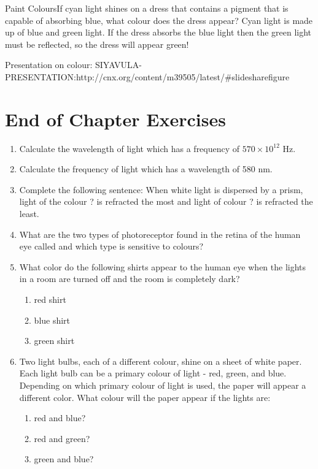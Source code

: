 \begin{wex}{Paint Colours}{If cyan light shines on a dress that contains a pigment that is capable of absorbing blue, what colour does the dress appear?}
{
Cyan light is made up of blue and green light.
If the dress absorbs the blue light then the green light must be reflected, so the dress will appear green!}
\end{wex}
Presentation on colour: SIYAVULA-PRESENTATION:http://cnx.org/content/m39505/latest/#slidesharefigure


\section{End of Chapter Exercises}
\begin{enumerate}

\item{Calculate the wavelength of light which has a frequency of $570 \times 10^{12}$ Hz.}

\item{Calculate the frequency of light which has a wavelength of 580 nm.}

\item{Complete the following sentence: When white light is dispersed by a prism, light of the colour ? is refracted the most and light of colour ? is refracted the least.}

\item{What are the two types of photoreceptor found in the retina of the human eye called and which type is sensitive to colours?}

\item{What color do the following shirts appear to the human eye when the lights in a room are turned off and the room is completely dark?
\begin{enumerate}
\item{red shirt}
\item{blue shirt}
\item{green shirt}
\end{enumerate}}
\item{Two light bulbs, each of a different colour, shine on a sheet of white paper. Each light bulb can be a primary colour of light - red, green, and blue. Depending on which primary colour of light is used, the paper will appear a different color. What colour will the paper appear if the lights are:
\begin{enumerate}
\item{red and blue?}
\item{red and green?}
\item{green and blue?}
\end{enumerate}}


\end{enumerate}
